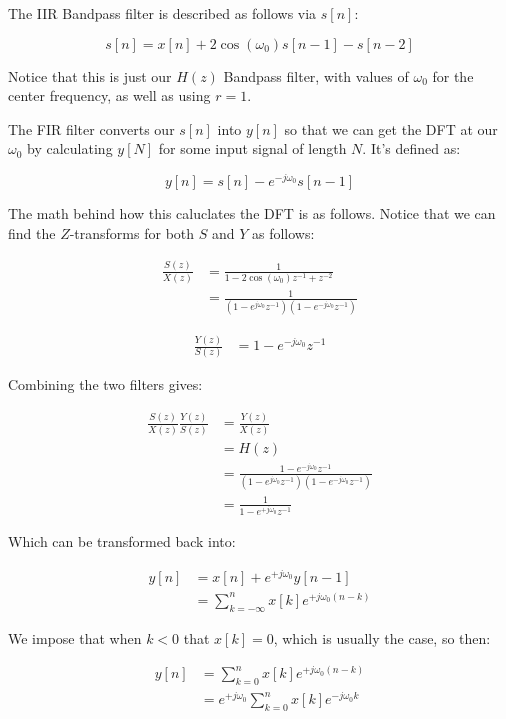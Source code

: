 \documentclass[12pt]{article}
\begin{document}
The IIR Bandpass filter is described as follows via $s[n]$:

\[
    s[n] = x[n] + 2\cos(\omega_0)s[n-1] - s[n-2]
\]

Notice that this is just our $H(z)$ Bandpass filter, 
with values of $\omega_0$ for the center 
frequency, as well as using $r = 1$.

The FIR filter converts our $s[n]$ into $y[n]$ so that 
we can get the DFT at our $\omega_0$ by calculating $y[N]$ for 
some input signal of length $N$. It's defined as:

\[
    y[n] = s[n] - e^{-j \omega_0}s[n-1]
\]

The math behind how this caluclates the DFT is as follows. Notice 
that we can find the $Z$-transforms for both $S$ and $Y$ as follows:

\begin{align*}
    \frac{S(z)}{X(z)} &= \frac{1}{1 - 2\cos(\omega_0)z^{-1} + z^{-2}} \\
    &= \frac{1}{(1-e^{j\omega_0}z^{-1})(1-e^{-j\omega_0}z^{-1})}
\end{align*}

\begin{align*}
    \frac{Y(z)}{S(z)} &= 1 - e^{-j\omega_0}z^{-1}
\end{align*}

Combining the two filters gives:

\begin{align*}
    \frac{S(z)}{X(z)}\frac{Y(z)}{S(z)} &= \frac{Y(z)}{X(z)} \\
    &= H(z) \\
    &= \frac{1 - e^{-j\omega_0}z^{-1}}{(1-e^{j\omega_0}z^{-1})(1-e^{-j\omega_0}z^{-1})} \\
    &= \frac{1}{1 - e^{+j\omega_0}z^{-1}}
\end{align*}

Which can be transformed back into: 

\begin{align*}
    y[n] &= x[n] + e^{+j\omega_0}y[n-1] \\
    &= \sum_{k = -\infty}^n x[k]e^{+j\omega_0(n-k)}
\end{align*}

We impose that when $k < 0$ that $x[k] = 0$, which is usually 
the case, so then:

\begin{align*}
    y[n] &= \sum_{k = 0}^n x[k]e^{+j\omega_0(n-k)} \\
    &= e^{+j\omega_0} \sum_{k=0}^n x[k]e^{-j\omega_0k}
\end{align*}
\end{document}
